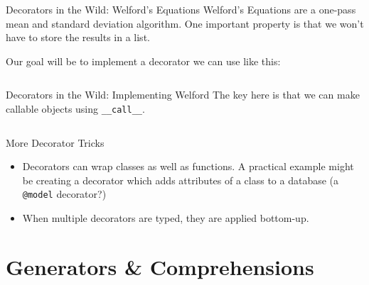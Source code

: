 \documentclass{lug}
\begin{document}
\begin{frame}{Decorators in the Wild: Welford's Equations}
    Welford's Equations are a one-pass mean and standard deviation algorithm.
    One important property is that we won't have to store the results in a
    list.

    \pause

    Our goal will be to implement a decorator we can use like this:
    \inputminted{python3}{examples/welford_usage.py}
\end{frame}

\begin{frame}{Decorators in the Wild: Implementing Welford}
    \small
    The key here is that we can make callable objects using
    \texttt{\_\_call\_\_}.

    \tiny
    \inputminted{python3}{examples/welford_class.py}

\end{frame}

\begin{frame}{More Decorator Tricks}
    \begin{itemize}[<+->]
        \item Decorators can wrap classes as well as functions. A practical
            example might be creating a decorator which adds attributes of a
            class to a database (a \texttt{@model} decorator?)
        \item When multiple decorators are typed, they are applied bottom-up.
    \end{itemize}
\end{frame}

\section{Generators \& Comprehensions}
\end{document}
